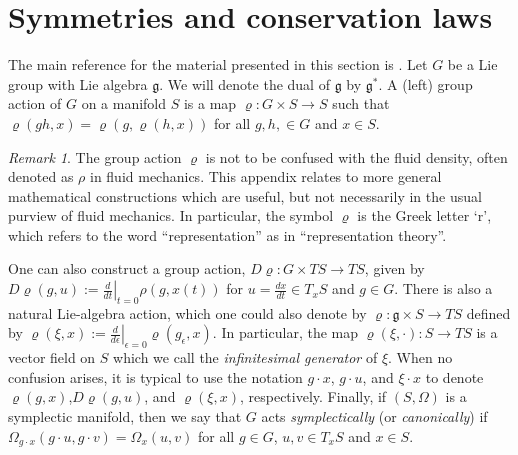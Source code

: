 \documentclass[12pt]{amsart}
\theoremstyle{remark}
\newtheorem{rmk}[thm]{Remark}
\begin{document}
\section{Symmetries and conservation laws}
\label{sec:symmetries}
The main reference for the material presented in this section is \cite{FOM}.
Let $G$ be a Lie group with Lie algebra $\mathfrak{g}$.
We will denote the dual of $\mathfrak{g}$ by $\mathfrak{g}^*$.
A (left) group action of $G$ on a manifold $S$ is a map $\varrho: G \times S \to S$
such that $\varrho( g h , x) = \varrho(g , \varrho(h , x))$ for all $g,h, \in G$ and $x \in S$.
\begin{rmk}
The group action $\varrho$ is not to be confused with the fluid density, often denoted as $\rho$ in fluid mechanics.
This appendix relates to more general mathematical constructions which are useful, but not necessarily in the usual purview of fluid mechanics.
In particular, the symbol $\varrho$ is the Greek letter `r', which refers to the word ``representation''
as in ``representation theory''.
\end{rmk}
One can also construct a group action, $D\varrho: G \times TS \to TS$,  given by
$D\varrho( g , u ) := \left.\frac{d}{dt}\right|_{t=0} \rho(g, x(t) )$ for $u = \frac{dx}{dt} \in T_x S$ and $g \in G$.
There is also a natural Lie-algebra action, which one could also denote by $\varrho: \mathfrak{g} \times S \to TS$
defined by $\varrho( \xi , x) := \left. \frac{d}{d \epsilon} \right|_{\epsilon =0} \varrho( g_\epsilon , x)$.
In particular, the map $\varrho( \xi , \cdot ) : S \to TS$ is a vector field on $S$ which we call the
\emph{infinitesimal generator} of $\xi$.
When no confusion arises, it is typical to use the notation $g \cdot x$, $g \cdot u$, and $\xi \cdot x$ to denote $\varrho(g,x)$,$D\varrho(g,u)$,  and $\varrho(\xi,x)$, respectively.
Finally, if $(S,\Omega)$ is a symplectic manifold, then we say that $G$ acts \emph{symplectically} (or \emph{canonically})
if $\Omega_{g \cdot x}( g \cdot u , g \cdot v) = \Omega_x(u,v)$ for all $g \in G$, $u,v \in T_x S$ and $x \in S$.
\end{document}
